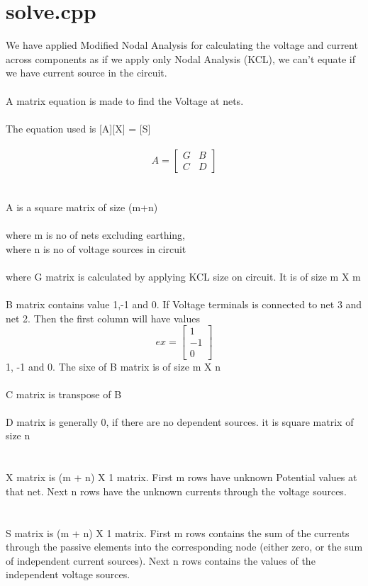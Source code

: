 \documentclass{scrreprt}
\begin{document}
\section{solve.cpp}
$ $ \\
We have applied Modified Nodal Analysis for calculating the voltage and current across components as if we apply only Nodal Analysis (KCL), we can't equate if we have current source in the circuit.\\
\\
A matrix equation is made to find the Voltage at nets.\\
\\
The equation used is  [A][X] = [S]\\
\\
\indent \[
A=
  \begin{bmatrix}
    G & B \\
    C & D
  \end{bmatrix}
\]\\
\\
\indent \indent A is a square matrix of size (m+n)\\
\\
\indent \indent \indent \indent where m is no of nets excluding earthing,\\
\indent \indent \indent \indent where n is no of voltage sources in circuit\\
\\

\indent where G matrix is calculated by applying KCL size on circuit. It is of size m X m\\
\\
\indent B matrix contains value 1,-1 and 0. If Voltage terminals is connected to net 3 and net 2. Then the first column will have values \[
ex=
  \begin{bmatrix}
    1\\
    -1\\
    0
  \end{bmatrix}
\]
1, -1 and 0. The sixe of B matrix is of size m X n\\
\\
\indent C matrix is transpose of B \\
\\
\indent D matrix is generally 0, if there are no dependent sources. it is square matrix of size n\\
\\
\\ X matrix is (m + n) X 1 matrix. First m rows have unknown Potential values at that net. Next n rows have the unknown currents through the voltage sources. \\
\\
\\ S matrix is (m + n) X 1 matrix. First m rows contains the sum of the currents through the passive elements into the corresponding node (either zero, or the sum of independent current sources). Next n rows contains the values of the independent voltage sources.\\
\\
\end{document}
